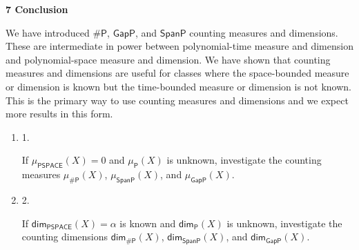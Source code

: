 \documentclass[10pt,a4paper]{article}
\begin{document}
\par\medskip\noindent\textbf{
7 Conclusion}\par




We have introduced ${\mathsf{\#}\mathsf{P}}$, $\mathsf{GapP}$, and
$\mathsf{SpanP}$ counting measures and dimensions. These are intermediate in power between polynomial-time measure and dimension and polynomial-space measure and dimension. We have shown that counting measures and dimensions are useful for classes where the space-bounded measure or dimension is known but the time-bounded measure or dimension is not known.
This is the primary way to use counting measures and dimensions and we expect more results in this form.\par


\begin{enumerate}


\item[] 
1. 


If $\mu_{\mathsf{PSPACE}}(X)=0$ and $\mu_{\mathsf{P}}(X)$ is unknown, investigate the counting measures $\mu_{{\mathsf{\#}\mathsf{P}}}(X)$, $\mu_{\mathsf{SpanP}}(X)$, and $\mu_{\mathsf{GapP}}(X)$.\par





\item[] 
2. 


If ${\mathsf{dim}}_{\mathsf{PSPACE}}(X)=\alpha$ is known and ${\mathsf{dim}}_{\mathsf{P}}(X)$ is unknown, investigate the counting dimensions ${\mathsf{dim}}_{{\mathsf{\#}\mathsf{P}}}(X)$, ${\mathsf{dim}}_{\mathsf{SpanP}}(X)$, and ${\mathsf{dim}}_{\mathsf{GapP}}(X)$.\par





\end{enumerate}
\end{document}
